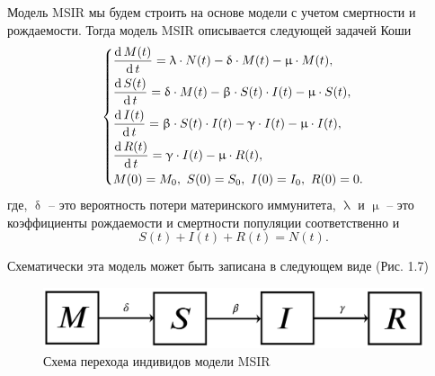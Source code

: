 \documentclass[a4paper, 14pt]{extreport}
\numberwithin{equation}{section}
\renewcommand{\beta}{\upbeta}
\renewcommand{\gamma}{\upgamma}
\renewcommand{\delta}{\updelta}
\renewcommand{\lambda}{\uplambda}
\renewcommand{\mu}{\upmu}
\renewcommand{\d}{\operatorname{d}}
\begin{document}
	Модель MSIR мы будем строить на основе модели с учетом смертности и рождаемости. Тогда модель MSIR описывается следующей задачей Коши
	\begin{equation}
	\begin{dcases}
	\dfrac {\d M(t)}{\d t} = \lambda \cdot N(t) - \delta\cdot M(t)-\mu\cdot M(t),\\
	\dfrac {\d S(t)}{\d t} = \delta \cdot M(t) -\beta\cdot S(t)\cdot I(t) - \mu \cdot S(t),\\
	\dfrac{\d I(t)}{\d t} =\beta\cdot S(t)\cdot I(t) - \gamma \cdot I(t) - \mu \cdot I(t),\\
	\dfrac{\d R(t)}{\d t} = \gamma\cdot I(t) - \mu \cdot R(t),\\
	M(0) = M_0,\ S(0) = S_0,\ I(0) = I_0,\ R(0) = 0.
	\end{dcases}
	\end{equation}
	где, $\delta$ -- это вероятность потери материнского иммунитета, $\lambda$ и $\mu$ -- это коэффициенты рождаемости и смертности популяции соответственно и $$S(t) + I(t) + R(t) = N(t).$$
	
	Схематически эта модель может быть записана в следующем виде (Рис. 1.7)
	\begin{figure}[h]
		\centering
		\includegraphics[scale=0.3]{images/img09}
		\caption{Схема перехода индивидов модели MSIR}
		\label{fig:img09}
	\end{figure}
	
\end{document}
